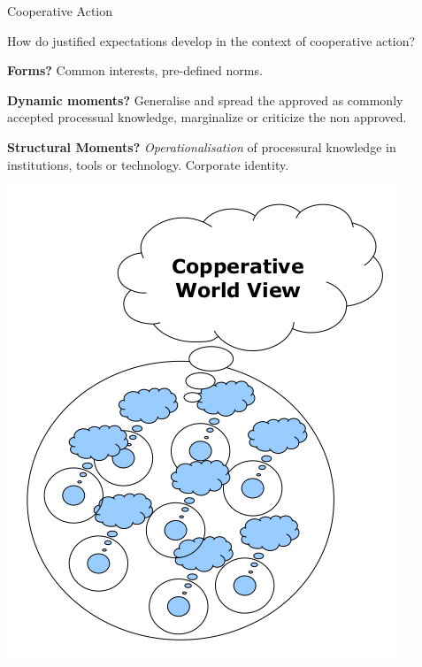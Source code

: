 \documentclass{beamer}
\begin{document}
\begin{frame}{Cooperative Action}

  \begin{minipage}{.5\textwidth}\small
  How do justified expectations develop in the context of cooperative action?
  
\textbf{Forms?} Common interests, pre-defined norms.

\textbf{Dynamic moments?} Generalise and spread the approved as commonly
accepted processual knowledge, marginalize or criticize the non approved.

\textbf{Structural Moments?}  \emph{Operationalisation} of processural
knowledge in institutions, tools or technology.  Corporate identity.
  \end{minipage}
\hfill
  \begin{minipage}{.47\textwidth}
  \begin{center}
    \includegraphics[width=\textwidth]{KA-2.png}
  \end{center}
  
  \end{minipage}
\end{frame}
\end{document}
